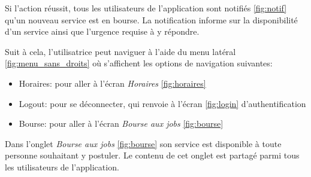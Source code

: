 Si l'action réussit, tous les utilisateurs de l'application sont notifiés \ref{fig:notif} qu'un
nouveau service est en bourse. La notification informe sur la disponibilité d'un service ainsi que 
l'urgence requise à y répondre.

Suit à cela, l'utilisatrice peut naviguer à l'aide du menu latéral \ref{fig:menu_sans_droits} où s'affichent les options
de navigation suivantes:
\smallskip
\begin{itemize}
    \item Horaires: pour aller à l'écran \textit{Horaires} \ref{fig:horaires}
    \item Logout: pour se déconnecter, qui renvoie à l'écran \ref{fig:login} d'authentification
    \item Bourse: pour aller à l'écran \textit{Bourse aux jobs} \ref{fig:bourse}
\end{itemize}

\newpage
Dans l'onglet \textit{Bourse aux jobs} \ref{fig:bourse} son service est disponible à toute personne souhaitant y postuler. 
Le contenu de cet onglet est partagé parmi tous les utilisateurs de l'application.

